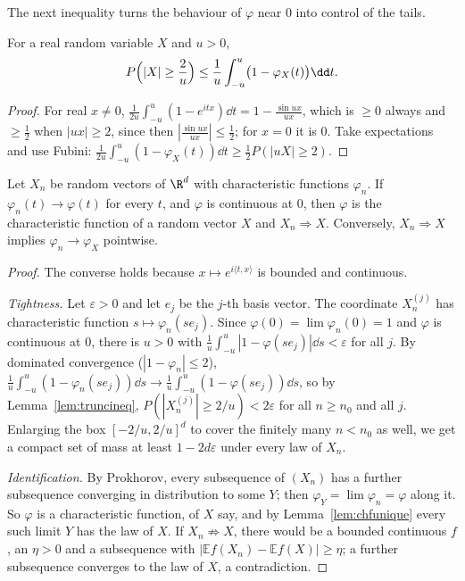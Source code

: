 The next inequality turns the behaviour of $\varphi$ near $0$ into control of the tails.

\begin{lemma}\label{lem:truncineq}
For a real random variable $X$ and $u>0$,
\[
P\Bigl(|X|\ge\frac2u\Bigr)\le\frac1u\int_{-u}^u\bigl(1-\varphi_X(t)\bigr)\dd t.
\]
\end{lemma}
\begin{proof}
For real $x\ne0$, $\frac1{2u}\int_{-u}^u(1-e^{itx})\dd t=1-\frac{\sin ux}{ux}$, which is $\ge0$ always and $\ge\frac12$ when $|ux|\ge2$, since then
$|\frac{\sin ux}{ux}|\le\frac12$; for $x=0$ it is $0$. Take expectations and use Fubini: $\frac1{2u}\int_{-u}^u(1-\varphi_X(t))\dd t\ge\frac12P(|uX|\ge2)$.
\end{proof}

\begin{theorem}\label{thm:levycont}
Let $X_n$ be random vectors of $\R^d$ with characteristic functions $\varphi_n$. If $\varphi_n(t)\to\varphi(t)$ for every $t$, and $\varphi$ is continuous at
$0$, then $\varphi$ is the characteristic function of a random vector $X$ and $X_n\Rightarrow X$. Conversely, $X_n\Rightarrow X$ implies $\varphi_n\to\varphi_X$
pointwise.
\end{theorem}
\begin{proof}
The converse holds because $x\mapsto e^{i\langle t,x\rangle}$ is bounded and continuous.

\emph{Tightness.} Let $\varepsilon>0$ and let $e_j$ be the $j$-th basis vector. The coordinate $X_n^{(j)}$ has characteristic function $s\mapsto\varphi_n(se_j)$.
Since $\varphi(0)=\lim\varphi_n(0)=1$ and $\varphi$ is continuous at $0$, there is $u>0$ with $\frac1u\int_{-u}^u|1-\varphi(se_j)|\dd s<\varepsilon$ for all $j$. By
dominated convergence ($|1-\varphi_n|\le2$), $\frac1u\int_{-u}^u(1-\varphi_n(se_j))\dd s\to\frac1u\int_{-u}^u(1-\varphi(se_j))\dd s$, so by
Lemma~\ref{lem:truncineq}, $P(|X_n^{(j)}|\ge2/u)<2\varepsilon$ for all $n\ge n_0$ and all $j$. Enlarging the box $[-2/u,2/u]^d$ to cover the finitely many
$n<n_0$ as well, we get a compact set of mass at least $1-2d\varepsilon$ under every law of $X_n$.

\emph{Identification.} By Prokhorov, every subsequence of $(X_n)$ has a further subsequence converging in distribution to some $Y$; then $\varphi_Y=\lim\varphi_n
=\varphi$ along it. So $\varphi$ is a characteristic function, of $X$ say, and by Lemma~\ref{lem:chfunique} every such limit $Y$ has the law of $X$. If
$X_n\not\Rightarrow X$, there would be a bounded continuous $f$, an $\eta>0$ and a subsequence with $|\mathbb E f(X_n)-\mathbb E f(X)|\ge\eta$; a further
subsequence converges to the law of $X$, a contradiction.
\end{proof}

